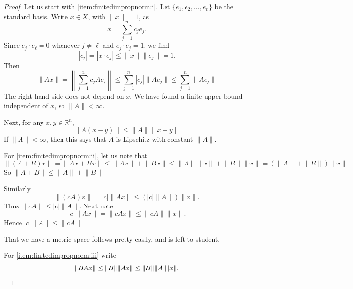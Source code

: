 \documentclass[12pt]{book}
\newcommand{\snorm}[1]{\lVert {#1} \rVert}
\newcommand{\abs}[1]{\left\lvert {#1} \right\rvert}
\newcommand{\norm}[1]{\left\lVert {#1} \right\rVert}
\newcommand{\R}{{\mathbb{R}}}
\theoremstyle{plain}
\theoremstyle{remark}
\theoremstyle{definition}
\theoremstyle{exercise}
\theoremstyle{example}
\begin{document}
\begin{proof}
Let us start with \ref{item:finitedimpropnorm:i}.
Let $\{ e_1,e_2,\ldots,e_n \}$ be the standard basis.
Write $x \in X$, with $\snorm{x} = 1$, as
\begin{equation*}
x = \sum_{j=1}^n c_j e_j .
\end{equation*}
Since $e_j \cdot e_\ell = 0$ whenever $j\not=\ell$ and $e_j \cdot e_j = 1$, we find
\begin{equation*}
\abs{c_j} = \abs{ x \cdot e_j }
\leq \snorm{x} \snorm{e_j} = 1 .
\end{equation*}
Then
\begin{equation*}
\snorm{Ax} =
\norm{\sum_{j=1}^n c_j Ae_j}
\leq
\sum_{j=1}^n \abs{c_j} \snorm{Ae_j} 
\leq
\sum_{j=1}^n \snorm{Ae_j} 
\end{equation*}
The right hand side does not depend on $x$.  We have found
a finite upper bound independent of $x$, so $\snorm{A} < \infty$.

Next, for any $x,y \in \R^n$,
\begin{equation*}
\snorm{A(x-y)} \leq \snorm{A} \snorm{x-y}
\end{equation*}
If $\snorm{A} < \infty$, then this says that $A$ is Lipschitz with constant $\snorm{A}$.

For \ref{item:finitedimpropnorm:ii}, let us note that
\begin{equation*}
\snorm{(A+B)x} =
\snorm{Ax+Bx} \leq
\snorm{Ax}+\snorm{Bx} \leq
\snorm{A} \snorm{x}+\snorm{B}\snorm{x} =
(\snorm{A}+\snorm{B}) \snorm{x} .
\end{equation*}
So $\snorm{A+B} \leq \snorm{A}+\snorm{B}$.

Similarly
\begin{equation*}
\snorm{(cA)x} =
\abs{c} \snorm{Ax} \leq (\abs{c}\snorm{A}) \snorm{x} .
\end{equation*}
Thus $\snorm{cA} \leq \abs{c}\snorm{A}$.  Next note 
\begin{equation*}
\abs{c} \snorm{Ax}
=
\snorm{cAx} \leq \snorm{cA} \snorm{x} .
\end{equation*}
Hence $\abs{c}\snorm{A} \leq \snorm{cA}$.

That we have a metric space follows pretty easily, and is left to student.

For \ref{item:finitedimpropnorm:iii} write
\begin{equation*}
\snorm{BAx} \leq \snorm{B} \snorm{Ax} \leq \snorm{B} \snorm{A} \snorm{x} .
\qedhere
\end{equation*}
\end{proof}
\end{document}
